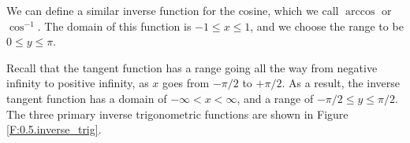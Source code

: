 
We can define a similar inverse function for the cosine, which we call $\arccos$ or
$\cos^{-1}$.  The domain of this function is $-1 \leq x \leq 1$, and we choose the range
to be $0 \leq y \leq \pi$.



Recall that the tangent function has a range going all the way from negative infinity to
positive infinity, as $x$ goes from $-\pi/2$ to $+\pi/2$.  As a result, the inverse
tangent function has a domain of $-\infty < x < \infty$, and a range of $-\pi/2 \leq y
\leq \pi/2$.  The three primary inverse trigonometric functions are shown in Figure
\ref{F:0.5.inverse_trig}.

